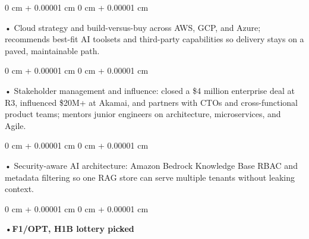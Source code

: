 \documentclass[10pt, letterpaper]{article}
\newenvironment{onecolentry}{
    \begin{adjustwidth}{
        0 cm + 0.00001 cm
    }{
        0 cm + 0.00001 cm
    }
}{
    \end{adjustwidth}
} %
\begin{document}
        \begin{onecolentry}
            • Cloud strategy and build-versus-buy across AWS, GCP, and Azure; recommends best-fit AI toolsets and third-party capabilities so delivery stays on a paved, maintainable path.
        \end{onecolentry}
        \begin{onecolentry}
            • Stakeholder management and influence: closed a \$4 million enterprise deal at R3, influenced \$20M+ at Akamai, and partners with CTOs and cross-functional product teams; mentors junior engineers on architecture, microservices, and Agile.
        \end{onecolentry}
        \begin{onecolentry}
            • Security-aware AI architecture: Amazon Bedrock Knowledge Base RBAC and metadata filtering so one RAG store can serve multiple tenants without leaking context.
        \end{onecolentry}
        \begin{onecolentry}
                \textbf{•F1/OPT, H1B lottery picked}
        \end{onecolentry}

    \vspace{2 pt }
\end{document}
